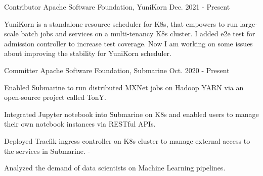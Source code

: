 

\begin{cventries}

  \cventry
    {Contributor} %
    {Apache Software Foundation, YuniKorn} %
    {} %
    {Dec. 2021 - Present} %
    {
      \begin{cvitems} %
        \item {YuniKorn is a standalone resource scheduler for K8s, that empowers to run large-scale batch jobs and services on a multi-tenancy K8s cluster. I added e2e test for admission controller to increase test coverage. Now I am working on some issues about improving the stability for YuniKorn scheduler.}
      \end{cvitems}
    }
  \cventry
    {Committer} %
    {Apache Software Foundation, Submarine} %
    {} %
    {Oct. 2020 - Present} %
    {
      \begin{cvitems} %
        \item {Enabled Submarine to run distributed MXNet jobs on Hadoop YARN via an open-source project called TonY.}
        \item {Integrated Jupyter notebook into Submarine on K8s and enabled users to manage their own notebook instances via RESTful APIs.}
        \item {Deployed Traefik ingress controller on K8s cluster to manage external access to the services in Submarine.}
-       \item {Analyzed the demand of data scientists on Machine Learning pipelines.}
      \end{cvitems}
    }
\end{cventries}
